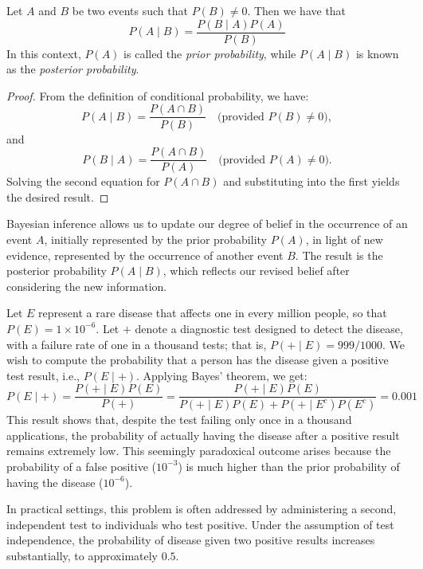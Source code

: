 \begin{theorem}\label{th:Bayes_theorem} Let $A$ and $B$ be two events such that $P\left( B \right) \neq 0$. Then we have that
\[
P \left( A \mid B \right) = \frac{P \left( B \mid A \right) P \left( A \right)}{P \left( B \right)}
\]
In this context, $P\left( A \right)$ is called the \emph{prior probability}, while $P\left( A \mid B \right)$ is known as the \emph{posterior probability}.
\end{theorem}
\begin{proof}
From the definition of conditional probability, we have:
\[
P \left( A \mid B \right) = \frac{P \left( A \cap B \right)}{P \left( B \right)} \quad \text{(provided } P \left( B \right) \neq 0\text{)},
\]
and
\[
P \left( B \mid A \right) = \frac{P \left( A \cap B \right)}{P \left( A \right)} \quad \text{(provided } P \left( A \right) \neq 0\text{)}.
\]
Solving the second equation for $P \left( A \cap B \right)$ and substituting into the first yields the desired result.
\end{proof}

Bayesian inference allows us to update our degree of belief in the occurrence of an event $A$, initially represented by the prior probability $P\left( A \right)$, in light of new evidence, represented by the occurrence of another event $B$. The result is the posterior probability $P\left( A \mid B \right)$, which reflects our revised belief after considering the new information.

\begin{example}
Let $E$ represent a rare disease that affects one in every million people, so that $P(E) = 1 \times 10^{-6}$. Let $+$ denote a diagnostic test designed to detect the disease, with a failure rate of one in a thousand tests; that is, $P(+ \mid E) = 999/1000$. We wish to compute the probability that a person has the disease given a positive test result, i.e., $P(E \mid +)$. Applying Bayes' theorem, we get:
\[
P(E \mid +) = \frac{P(+ \mid E) P(E)}{P(+)} = \frac{P(+ \mid E) P(E)}{P(+ \mid E) P(E) + P(+ \mid E^c) P(E^c)} = 0.001
\]
This result shows that, despite the test failing only once in a thousand applications, the probability of actually having the disease after a positive result remains extremely low. This seemingly paradoxical outcome arises because the probability of a false positive ($10^{-3}$) is much higher than the prior probability of having the disease ($10^{-6}$).

In practical settings, this problem is often addressed by administering a second, independent test to individuals who test positive. Under the assumption of test independence, the probability of disease given two positive results increases substantially, to approximately $0.5$.
\end{example}

